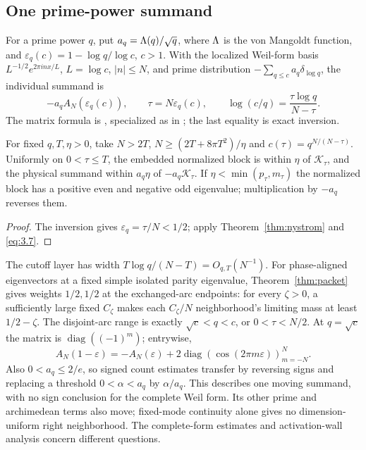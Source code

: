 \subsection{One prime-power summand}\label{sec:arith}
For a prime power $q$, put $a_q=\Lambda(q)/\sqrt q$, where $\Lambda$
is the von Mangoldt function, and
$\varepsilon_q(c)=1-\log q/\log c$, $c>1$.
With the localized Weil-form basis $L^{-1/2}e^{2\pi inx/L}$,
$L=\log c$, $|n|\le N$, and prime distribution
$-\sum_{q\le c}a_q\delta_{\log q}$, the individual summand is
\begin{equation}\label{eq:5.1}
 -a_qA_N(\varepsilon_q(c)),\qquad
 \tau=N\varepsilon_q(c),\qquad
 \log(c/q)=\frac{\tau\log q}{N-\tau}.
\end{equation}
The matrix formula is \cite[Proposition~4.1]{CvS}, specialized as in
\cite{SilvaPrime}; the last equality is exact inversion.
\begin{corollary}\label{cor:design}
For fixed $q,T,\eta>0$, take $N>2T$, $N\ge(2T+8\pi T^2)/\eta$
and $c(\tau)=q^{N/(N-\tau)}$. Uniformly on $0<\tau\le T$, the embedded
normalized block is within $\eta$ of $\mathcal K_\tau$, and the physical
summand within $a_q\eta$ of $-a_q\mathcal K_\tau$.
If $\eta<\min(p_\tau,m_\tau)$ the normalized block has a positive even
and negative odd eigenvalue; multiplication by $-a_q$ reverses them.
\end{corollary}
\begin{proof}
The inversion gives $\varepsilon_q=\tau/N<1/2$; apply
Theorem~\ref{thm:nystrom} and \eqref{eq:3.7}.
\end{proof}
The cutoff layer has width $T\log q/(N-T)=O_{q,T}(N^{-1})$.
For phase-aligned eigenvectors at a fixed simple isolated parity eigenvalue,
Theorem~\ref{thm:packet} gives weights $1/2,1/2$ at the exchanged-arc
endpoints: for every $\zeta>0$, a sufficiently large fixed $C_\zeta$
makes each $C_\zeta/N$ neighborhood's limiting mass at least $1/2-\zeta$.
The disjoint-arc range is exactly $\sqrt c<q<c$, or $0<\tau<N/2$.
At $q=\sqrt c$ the matrix is $\operatorname{diag}((-1)^m)$; entrywise,
\begin{equation}\label{eq:5.6}
 A_N(1-\varepsilon)=-A_N(\varepsilon)
 +2\operatorname{diag}(\cos(2\pi m\varepsilon))_{m=-N}^N.
\end{equation}
Also $0<a_q\le2/e$, so signed count estimates transfer by reversing signs
and replacing a threshold $0<\alpha<a_q$ by $\alpha/a_q$.
This describes one moving summand, with no sign conclusion for the complete
Weil form. Its other prime and archimedean terms also move; fixed-mode
continuity alone gives no dimension-uniform right neighborhood.
The complete-form estimates \cite{Zhu2026,Angelone2026} and activation-wall
analysis \cite{Tao2026} concern different questions.
